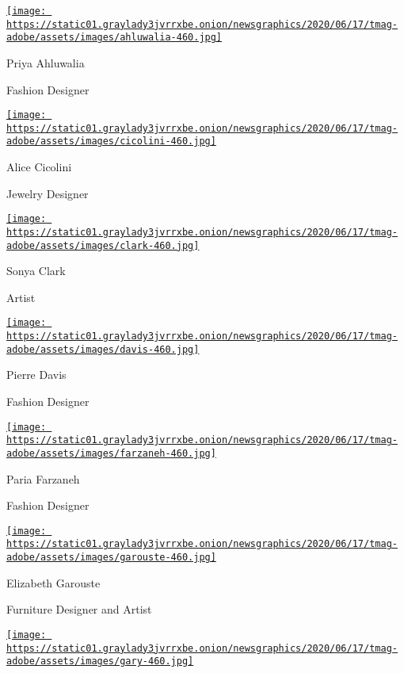 \href{https://www.nytimes3xbfgragh.onion/section/t-magazine}{}

\href{https://www.nytimes3xbfgragh.onion/2020/08/10/t-magazine/priya-ahluwalia-fashion-menswear.html}{\texttt{[image: https://static01.graylady3jvrrxbe.onion/newsgraphics/2020/06/17/tmag-adobe/assets/images/ahluwalia-460.jpg]}}

Priya Ahluwalia

Fashion Designer

\href{https://www.nytimes3xbfgragh.onion/2020/08/10/t-magazine/alice-cicolini-jewelry-art.html}{\texttt{[image: https://static01.graylady3jvrrxbe.onion/newsgraphics/2020/06/17/tmag-adobe/assets/images/cicolini-460.jpg]}}

Alice Cicolini

Jewelry Designer

\href{https://nytimes3xbfgragh.onion/2020/08/10/t-magazine/sonya-clark-flags-art.html}{\texttt{[image: https://static01.graylady3jvrrxbe.onion/newsgraphics/2020/06/17/tmag-adobe/assets/images/clark-460.jpg]}}

Sonya Clark

Artist

\href{https://www.nytimes3xbfgragh.onion/2020/08/10/t-magazine/pierre-davis-no-sesso.html}{\texttt{[image: https://static01.graylady3jvrrxbe.onion/newsgraphics/2020/06/17/tmag-adobe/assets/images/davis-460.jpg]}}

Pierre Davis

Fashion Designer

\href{https://www.nytimes3xbfgragh.onion/2020/08/10/t-magazine/paria-farzaneh-fashion-menswear.html}{\texttt{[image: https://static01.graylady3jvrrxbe.onion/newsgraphics/2020/06/17/tmag-adobe/assets/images/farzaneh-460.jpg]}}

Paria Farzaneh

Fashion Designer

\href{https://www.nytimes3xbfgragh.onion/2020/08/10/t-magazine/elizabeth-garouste-interior-design.html}{\texttt{[image: https://static01.graylady3jvrrxbe.onion/newsgraphics/2020/06/17/tmag-adobe/assets/images/garouste-460.jpg]}}

Elizabeth Garouste

Furniture Designer and Artist

\href{https://www.nytimes3xbfgragh.onion/2020/08/10/t-magazine/jatovia-gary-film.html}{\texttt{[image: https://static01.graylady3jvrrxbe.onion/newsgraphics/2020/06/17/tmag-adobe/assets/images/gary-460.jpg]}}

